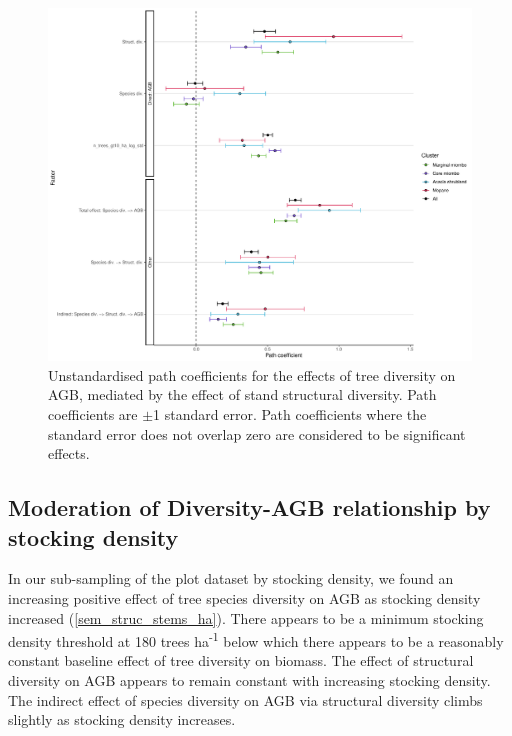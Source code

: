 \documentclass[11pt,a4paper]{article}
\newcommand{\textapprox}{\raisebox{0.5ex}{\texttildelow}}  %
\begin{document}
\begin{figure}[H]
\centering
	\includegraphics[width=\textwidth]{struc_model_slopes_all}
	\caption{Unstandardised path coefficients for the effects of tree diversity on AGB, mediated by the effect of stand structural diversity. Path coefficients are $\pm$1 standard error. Path coefficients where the standard error does not overlap zero are considered to be significant effects.}
	\label{struc_model_slopes_all}
\end{figure}



\subsection{Moderation of Diversity-AGB relationship by stocking density}

In our sub-sampling of the plot dataset by stocking density, we found an increasing positive effect of tree species diversity on AGB as stocking density increased (\autoref{sem_struc_stems_ha}). There appears to be a minimum stocking density threshold at \textapprox{}180 trees ha\textsuperscript{-1} below which there appears to be a reasonably constant baseline effect of tree diversity on biomass. The effect of structural diversity on AGB appears to remain constant with increasing stocking density. The indirect effect of species diversity on AGB via structural diversity climbs slightly as stocking density increases.
\end{document}
